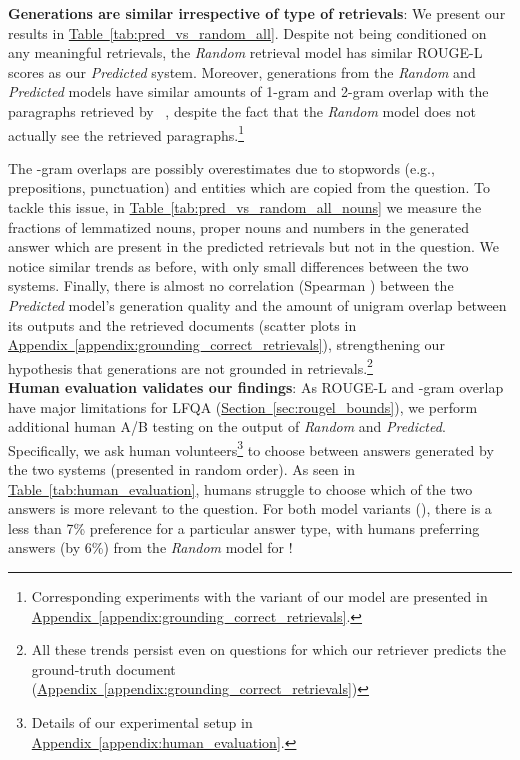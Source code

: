 \documentclass[11pt]{article}
\newcommand{\namedref}[2]{\hyperref[#2]{#1~\ref*{#2}}}
\newcommand{\sectionref}[1]{\namedref{Section}{#1}}
\newcommand{\tableref}[1]{\namedref{Table}{#1}}
\newcommand{\appendixref}[1]{\namedref{Appendix}{#1}}
\newcommand{\retriever}[1]{\textsc{c-REALM}}
\begin{document}
\noindent \textbf{Generations are similar irrespective of type of retrievals}: We present our results in \tableref{tab:pred_vs_random_all}. Despite not being conditioned on any meaningful retrievals, the \emph{Random} retrieval model has similar ROUGE-L scores as our \emph{Predicted} system. Moreover, generations from the \emph{Random} and \emph{Predicted} models have similar amounts of 1-gram and 2-gram overlap with the paragraphs retrieved by \retriever~, despite the fact that the \emph{Random} model does not actually see the retrieved paragraphs.\footnote{Corresponding experiments with the  variant of our model are presented in \appendixref{appendix:grounding_correct_retrievals}.}

The -gram overlaps are possibly overestimates due to stopwords (e.g., prepositions, punctuation) and entities which are copied from the question. To tackle this issue, in \tableref{tab:pred_vs_random_all_nouns} we measure the fractions of lemmatized nouns, proper nouns and numbers in the generated answer which are present in the predicted retrievals but not in the question. We notice similar trends as before, with only small differences between the two systems.
Finally, there is almost no correlation (Spearman ) between the \emph{Predicted} model's generation quality and the amount of unigram overlap between its outputs and the retrieved documents (scatter plots in \appendixref{appendix:grounding_correct_retrievals}), strengthening our hypothesis that generations are not grounded in retrievals.\footnote{All these trends persist even on questions for which our retriever predicts the ground-truth document (\appendixref{appendix:grounding_correct_retrievals})}\\

\noindent \textbf{Human evaluation validates our findings}: As ROUGE-L and -gram overlap have major limitations for LFQA (\sectionref{sec:rougel_bounds}), we perform additional human A/B testing on the output of \emph{Random} and \emph{Predicted}. Specifically, we ask human volunteers\footnote{Details of our experimental setup in \appendixref{appendix:human_evaluation}.} to choose between answers generated by the two systems (presented in random order). As seen in \tableref{tab:human_evaluation}, humans struggle to choose which of the two answers is more relevant to the question. For both model variants (), there is a less than 7\% preference for a particular answer type, with humans preferring answers (by 6\%) from the \emph{Random} model for !\\
\end{document}
